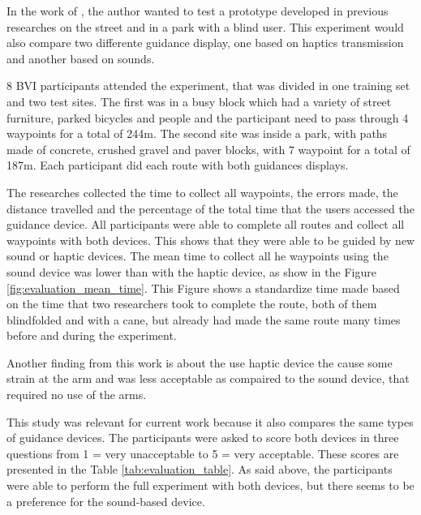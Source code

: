 In the work of \cite{marston2006evaluation}, the author wanted to test a prototype developed in previous researches on the street and in a park with a blind user. This experiment would also compare two differente guidance display, one based on haptics transmission and another based on sounds.

8 BVI participants attended the experiment, that was divided in one training set and two test sites. The first was in a busy block which had a variety of street furniture, parked bicycles and people and the participant need to pass through 4 waypoints for a total of 244m. The second site was inside a park, with paths made of concrete, crushed gravel and paver blocks, with 7 waypoint for a total of 187m. Each participant did each route with both guidances displays.

The researches collected the time to collect all waypoints, the errors made, the distance travelled and the percentage of the total time that the users accessed the guidance device. All participants were able to complete all routes and collect all waypoints with both devices. This shows that they were able to be guided by new sound or haptic devices. The mean time to collect all he waypoints using the sound device was lower than with the haptic device, as show in the Figure \ref{fig:evaluation_mean_time}. This Figure shows a standardize time made based on the time that two researchers took to complete the route, both of them blindfolded and with a cane, but already had made the same route many times before and during the experiment.




Another finding from this work is about the use haptic device the cause some strain at the arm and was less acceptable as compaired to the sound device, that required no use of the arms.

This study was relevant for current work because it also compares the same types of guidance devices. The participants were asked to score both devices in three questions from 1 = very unacceptable to 5 = very acceptable. These scores are presented in the Table \ref{tab:evaluation_table}. As said above, the participants were able to perform the full experiment with both devices, but there seems to be a preference for the sound-based device.

